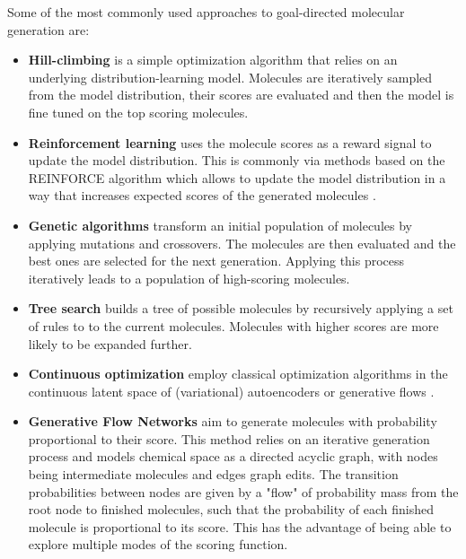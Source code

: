 Some of the most commonly used approaches to goal-directed molecular generation are:
\begin{itemize}
      \item \textbf{Hill-climbing}
            \citep{seglerGeneratingFocusedMolecule2018,xieMARSMarkovMolecular2021} is a simple
            optimization algorithm that relies on an underlying distribution-learning model.
            Molecules are iteratively sampled from the model distribution, their scores are
            evaluated and then the model is fine tuned on the top scoring molecules.
      \item \textbf{Reinforcement learning} uses the molecule scores as a reward signal to update
            the model distribution. This is commonly via methods based on the REINFORCE algorithm
            \citep{williamsSimpleStatisticalGradientfollowing1992} which allows to update the model
            distribution in a way that increases expected scores of the generated molecules
            \citep{olivecronaMolecularDenovoDesign2017,thomasAugmentedHillClimbIncreases2022,youGraphConvolutionalPolicy2019,guoAugmentedMemoryCapitalizing2023}.
      \item \textbf{Genetic algorithms} transform an initial population of molecules by applying
            mutations and crossovers. The molecules are then evaluated and the best ones are
            selected for the next generation. Applying this process iteratively leads to a
            population of high-scoring molecules.
      \item \textbf{Tree search} builds a tree of possible molecules by recursively applying a set
            of rules to to the current molecules. Molecules with higher scores are more likely to be
            expanded further.
      \item \textbf{Continuous optimization} employ classical optimization algorithms in the continuous
            latent space of (variational) autoencoders
            \citep{winterEfficientMultiobjectiveMolecular2019,gomez-bombarelliAutomaticChemicalDesign2018,kusnerGrammarVariationalAutoencoder2017}
            or generative flows \citep{madhawaGraphNVPInvertibleFlow2019}.
      \item \textbf{Generative Flow Networks} \citep{bengioFlowNetworkBased2021} aim to generate
            molecules with probability proportional to their score. This method relies on an
            iterative generation process and models chemical space as a directed acyclic graph, with
            nodes being intermediate molecules and edges graph edits. The transition probabilities
            between nodes are given by a "flow" of probability mass from the root node to finished
            molecules, such that the probability of each finished molecule is proportional to its
            score. This has the advantage of being able to explore multiple modes of the scoring
            function.
\end{itemize}

